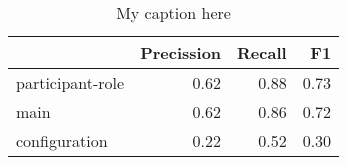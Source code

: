 \begin{table}[!ht]
\centering
\begin{tabular}{lrrr}
\toprule
{} &  Precission &  Recall &   F1 \\
\midrule
participant-role &        0.62 &    0.88 & 0.73 \\
main             &        0.62 &    0.86 & 0.72 \\
configuration    &        0.22 &    0.52 & 0.30 \\
\bottomrule
\end{tabular}
\caption{My caption here}
\label{tab:unit-elements-oe-exact-F1}
\end{table}